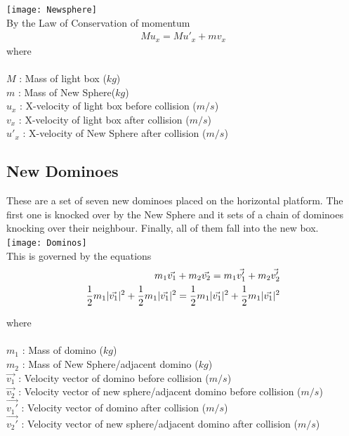 \documentclass{article}
\DeclarePairedDelimiter{\abs}{\lvert}{\rvert}
\begin{document}
\texttt{[image: Newsphere]}\\

By the Law of Conservation of momentum \cite{resnick}
\begin{eqnarray}
M{u_x} = M{u'_x} + m{v_x} \label {eq1:simp}
\end {eqnarray}
where \\\\
$M$ : Mass of light box ($kg$)\\
$m$ : Mass of New Sphere($kg$)\\
$u_x$ : X-velocity of light box before collision ($m/s$) \\
${v_x}$ : X-velocity of light box after collision ($m/s$)\\
${u'_x}$ : X-velocity of New Sphere after collision ($m/s$)\\


\subsection{New Dominoes}
These are a set of seven new dominoes placed on the horizontal platform. The first one is knocked over by the New Sphere and it sets of a chain of dominoes knocking over their neighbour. Finally, all of them fall into the new box.\\

\texttt{[image: Dominos]}\\

This is governed by the equations \cite{resnick} \\

\begin{eqnarray}
m_1\vec{v_1} + m_2\vec{v_2} = m_1\vec{v_1'} + m_2\vec{v_2'} \label  {eq2:simp} \\
\frac{1}{2}m_1\abs{\vec{v_1}}^2 + \frac{1}{2}m_1\abs{{\vec{v_1}}}^{2} = \frac{1}{2}m_1{\abs{\vec{v_1}}^{2}} + \frac{1}{2}m_1{\abs{\vec{v_1}}^{2}} \label  {eq3:simp}
\end{eqnarray}

where \\\\
$m_1$ : Mass of domino ($kg$)\\
$m_2$ : Mass of New Sphere/adjacent domino ($kg$)\\
$\vec{v_1}$ : Velocity vector of domino before collision ($m/s$) \\
$\vec{v_2}$ : Velocity vector of new sphere/adjacent domino before collision ($m/s$)\\
$\vec{v_1'}$ : Velocity vector of domino after collision ($m/s$)\\
$\vec{v_2'}$ : Velocity vector of new sphere/adjacent domino after collision ($m/s$)\\
\end{document}
